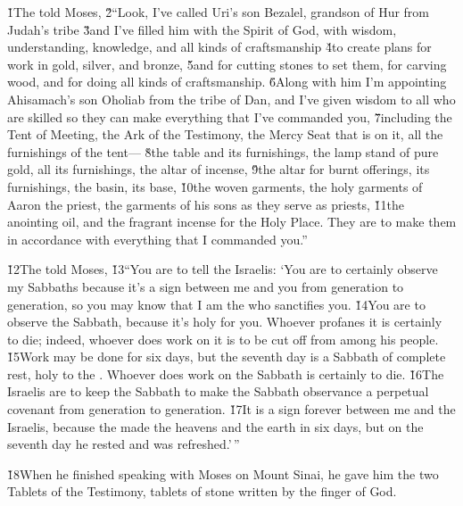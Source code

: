 \v{1}The  told Moses, \v{2}``Look, I've called Uri's son Bezalel, grandson of Hur from Judah's tribe \v{3}and I've filled him with the Spirit of God, with wisdom, understanding, knowledge, and all kinds of craftsmanship \v{4}to create plans for work in gold, silver, and bronze, \v{5}and for cutting stones to set them, for carving wood, and for doing all kinds of craftsmanship. \v{6}Along with him I'm appointing Ahisamach's son Oholiab from the tribe of Dan, and I've given wisdom to all who are skilled so they can make everything that I've commanded you, \v{7}including the Tent of Meeting, the Ark of the Testimony, the Mercy Seat that is on it, all the furnishings of the tent--- \v{8}the table and its furnishings, the lamp stand of pure gold, all its furnishings, the altar of incense, \v{9}the altar for burnt offerings, its furnishings, the basin, its base, \v{10}the woven garments, the holy garments of Aaron the priest, the garments of his sons as they serve as priests, \v{11}the anointing oil, and the fragrant incense for the Holy Place. They are to make them in accordance with everything that I commanded you.''

\v{12}The  told Moses, \v{13}``You are to tell the Israelis: `You are to certainly observe my Sabbaths because it's a sign between me and you from generation to generation, so you may know that I am the  who sanctifies you. \v{14}You are to observe the Sabbath, because it's holy for you. Whoever profanes it is certainly to die; indeed, whoever does work on it is to be cut off from among his people. \v{15}Work may be done for six days, but the seventh day is a Sabbath of complete rest, holy to the . Whoever does work on the Sabbath is certainly to die. \v{16}The Israelis are to keep the Sabbath to make the Sabbath observance a perpetual covenant from generation to generation. \v{17}It is a sign forever between me and the Israelis, because the  made the heavens and the earth in six days, but on the seventh day he rested and was refreshed.'\,''

\v{18}When he finished speaking with Moses on Mount Sinai, he gave him the two Tablets of the Testimony, tablets of stone written by the finger of God.

